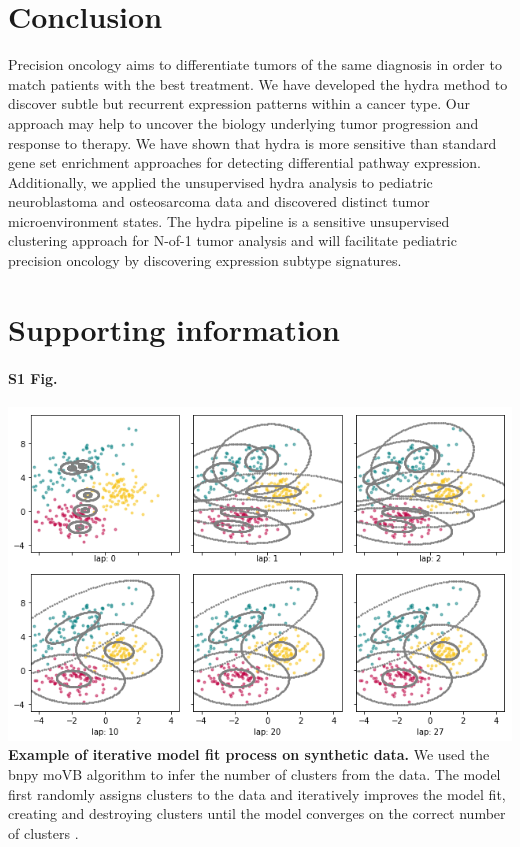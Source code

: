 \documentclass[10pt,letterpaper]{article}
\begin{document}
\section*{Conclusion}
Precision oncology aims to differentiate tumors of the same diagnosis in order to match patients with the best treatment. We have developed the hydra method to discover subtle but recurrent expression patterns within a cancer type. Our approach may help to uncover the biology underlying tumor progression and response to therapy. We have shown that hydra is more sensitive than standard gene set enrichment approaches for detecting differential pathway expression. Additionally, we applied the unsupervised hydra analysis to pediatric neuroblastoma and osteosarcoma data and discovered distinct tumor microenvironment states. The hydra pipeline is a sensitive unsupervised clustering approach for N-of-1 tumor analysis and will facilitate pediatric precision oncology by discovering expression subtype signatures.

\section*{Supporting information}

\paragraph*{S1 Fig.}
\includegraphics[width=\textwidth]{img/bnpy-example-fit}
\label{S1_Fig}
{\bf Example of iterative model fit process on synthetic data.} We used the bnpy moVB algorithm to infer the number of clusters from the data. The model first randomly assigns clusters to the data and iteratively improves the model fit, creating and destroying clusters until the model converges on the correct number of clusters \cite{hughesBnpyReliableScalable}. 
\end{document}
